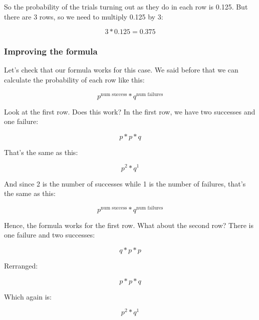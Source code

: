 \documentclass[../../../main.tex]{subfiles}
\begin{document}
\noindent
So the probability of the trials turning out as they do in each row is 0.125. But there are 3 rows, so we need to multiply 0.125 by 3:

\begin{equation*}
    3 * 0.125 = 0.375
\end{equation*}


\subsubsection{Improving the formula}

Let's check that our formula works for this case. We said before that we can calculate the probability of each row like this:

\begin{equation*}
    p^{\text{num success}} * q^{\text{num failures}}
\end{equation*}

Look at the first row. Does this work? In the first row, we have two successes and one failure:

\begin{equation*}
    p * p * q
\end{equation*}

That's the same as this:

\begin{equation*}
    p^{2} * q^{1}
\end{equation*}

And since 2 is the number of successes while 1 is the number of failures, that's the same as this:

\begin{equation*}
    p^{\text{num success}} * q^{\text{num failures}}
\end{equation*}

Hence, the formula works for the first row. What about the second row? There is one failure and two successes:

\begin{equation*}
    q * p * p
\end{equation*}

Rerranged:

\begin{equation*}
    p * p * q
\end{equation*}

Which again is:

\begin{equation*}
    p^{2} * q^{1}
\end{equation*}
\end{document}
